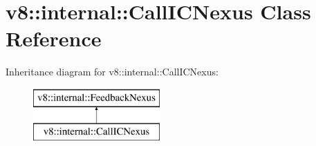 \hypertarget{classv8_1_1internal_1_1_call_i_c_nexus}{}\section{v8\+:\+:internal\+:\+:Call\+I\+C\+Nexus Class Reference}
\label{classv8_1_1internal_1_1_call_i_c_nexus}
Inheritance diagram for v8\+:\+:internal\+:\+:Call\+I\+C\+Nexus\+:\begin{figure}[H]
\begin{center}
\leavevmode
\includegraphics[height=2.000000cm]{classv8_1_1internal_1_1_call_i_c_nexus}
\end{center}
\end{figure}
